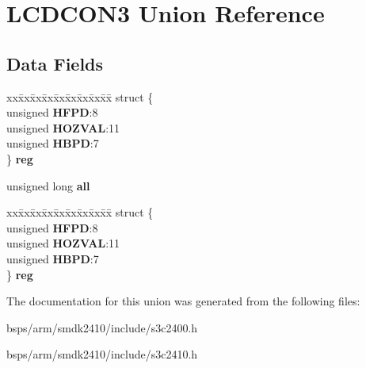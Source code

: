 \hypertarget{unionLCDCON3}{}\section{L\+C\+D\+C\+O\+N3 Union Reference}
\label{unionLCDCON3}
\subsection*{Data Fields}
\begin{DoxyCompactItemize}
\item 
\mbox{\label{unionLCDCON3_aabdbeafbbafddf448c5af2d8a7be10b0}} 
\begin{tabbing}
xx\=xx\=xx\=xx\=xx\=xx\=xx\=xx\=xx\=\kill
struct \{\\
\>unsigned {\bfseries HFPD}:8\\
\>unsigned {\bfseries HOZVAL}:11\\
\>unsigned {\bfseries HBPD}:7\\
\} {\bfseries reg}\\

\end{tabbing}\item 
\mbox{\label{unionLCDCON3_aac5add3931c2607f9627fa74e8b133d6}} 
unsigned long {\bfseries all}
\item 
\mbox{\label{unionLCDCON3_ad23cd786082906772fc39d4fc46cdc1e}} 
\begin{tabbing}
xx\=xx\=xx\=xx\=xx\=xx\=xx\=xx\=xx\=\kill
struct \{\\
\>unsigned {\bfseries HFPD}:8\\
\>unsigned {\bfseries HOZVAL}:11\\
\>unsigned {\bfseries HBPD}:7\\
\} {\bfseries reg}\\

\end{tabbing}\end{DoxyCompactItemize}


The documentation for this union was generated from the following files\+:\begin{DoxyCompactItemize}
\item 
bsps/arm/smdk2410/include/s3c2400.\+h\item 
bsps/arm/smdk2410/include/s3c2410.\+h\end{DoxyCompactItemize}

